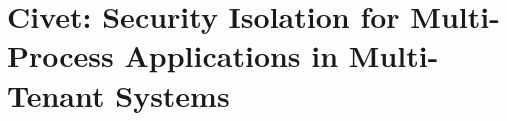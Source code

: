 
\chapter{Civet: Security Isolation for Multi-Process Applications in Multi-Tenant Systems}










